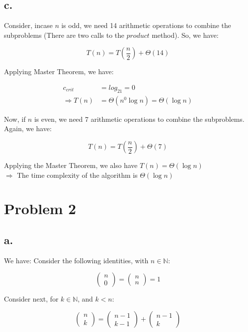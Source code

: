 \documentclass{article}
\begin{document}
\pagebreak
\subsection*{c.}
Consider, incase $n$ is odd, we need 14 arithmetic operations to combine the subproblems (There are two calls to the $product$ method). So, we have:

\[
T(n) = T(\frac{n}{2}) + \Theta(14)
\]

Applying Master Theorem, we have: 

\begin{align}
c_{crit} &= log_21 = 0 \\
\Rightarrow T(n) &= \Theta(n^0\log{n}) = \Theta(\log{n})
\end{align}

Now, if $n$ is even, we need 7 arithmetic operations to combine the subproblems. Again, we have:

\[
T(n) = T(\frac{n}{2}) + \Theta(7)
\]

Applying the Master Theorem, we also have $T(n) = \Theta(\log{n})$ \\
$\Rightarrow$ The time complexity of the algorithm is $\Theta(\log{n})$



\pagebreak
\section*{Problem 2}
\subsection*{a.}
We have: Consider the following identities, with ${n \in \mathbb{N}}$: 

\[
\begin{pmatrix} n \\ 0 \end{pmatrix} = \begin{pmatrix} n \\ n \end{pmatrix} = 1
\]

Consider next, for ${k \in \mathbb{N}}$, and ${k < n}$:

\[
\begin{pmatrix} n \\ k \end{pmatrix}
=
\begin{pmatrix} n - 1 \\ k - 1 \end{pmatrix} 
+ \begin{pmatrix} n - 1 \\ k \end{pmatrix}
\]
\end{document}
